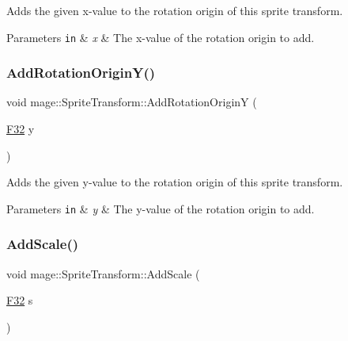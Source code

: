 Adds the given x-\/value to the rotation origin of this sprite transform.


\begin{DoxyParams}[1]{Parameters}
\mbox{\tt in}  & {\em x} & The x-\/value of the rotation origin to add. \\
\hline
\end{DoxyParams}
\hypertarget{structmage_1_1_sprite_transform_aa6fa39d59d2bd73d1b51ffbe185175a7}{}\label{structmage_1_1_sprite_transform_aa6fa39d59d2bd73d1b51ffbe185175a7} 
\subsubsection{\texorpdfstring{Add\+Rotation\+Origin\+Y()}{AddRotationOriginY()}}
{\footnotesize\ttfamily void mage\+::\+Sprite\+Transform\+::\+Add\+Rotation\+OriginY (\begin{DoxyParamCaption}\item[{\hyperlink{namespacemage_aa97e833b45f06d60a0a9c4fc22ae02c0}{F32}}]{y }\end{DoxyParamCaption})\hspace{0.3cm}{\ttfamily [noexcept]}}

Adds the given y-\/value to the rotation origin of this sprite transform.


\begin{DoxyParams}[1]{Parameters}
\mbox{\tt in}  & {\em y} & The y-\/value of the rotation origin to add. \\
\hline
\end{DoxyParams}
\hypertarget{structmage_1_1_sprite_transform_a44dd155f58f2ebdb7e44a366933863fa}{}\label{structmage_1_1_sprite_transform_a44dd155f58f2ebdb7e44a366933863fa} 
\subsubsection{\texorpdfstring{Add\+Scale()}{AddScale()}\hspace{0.1cm}{\footnotesize\ttfamily [1/4]}}
{\footnotesize\ttfamily void mage\+::\+Sprite\+Transform\+::\+Add\+Scale (\begin{DoxyParamCaption}\item[{\hyperlink{namespacemage_aa97e833b45f06d60a0a9c4fc22ae02c0}{F32}}]{s }\end{DoxyParamCaption})\hspace{0.3cm}{\ttfamily [noexcept]}}

